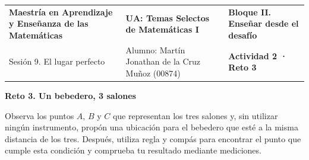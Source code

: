 \documentclass[spanish,letterpaper,landscape]{article}
\begin{document}
\newpage
\noindent
\begin{tabularx}{\textwidth}{@{} >{\raggedright\arraybackslash}p{} >{\centering\arraybackslash}X >{\raggedleft\arraybackslash}p{} @{}}
\footnotesize \textbf{Maestría en Aprendizaje y Enseñanza de las Matemáticas} &
\footnotesize \textbf{UA: Temas Selectos de Matemáticas I} &
\footnotesize \textbf{Bloque II. Enseñar desde el desafío} \\
\footnotesize Sesión 9. El lugar perfecto &
\footnotesize Alumno: Martín Jonathan de la Cruz Muñoz (00874) &
\footnotesize \textbf{Actividad 2 · Reto 3}
\end{tabularx}

\vspace{4pt}
\begin{center}
  {\normalsize\bfseries Reto 3. Un bebedero, 3 salones}
\end{center}
\vspace{2pt}
{\small Observa los puntos $A$, $B$ y $C$ que representan los tres salones y, sin utilizar ningún instrumento, propón una ubicación para el bebedero que esté a la misma distancia de los tres. Después, utiliza regla y compás para encontrar el punto que cumple esta condición y comprueba tu resultado mediante mediciones.}
\end{document}

